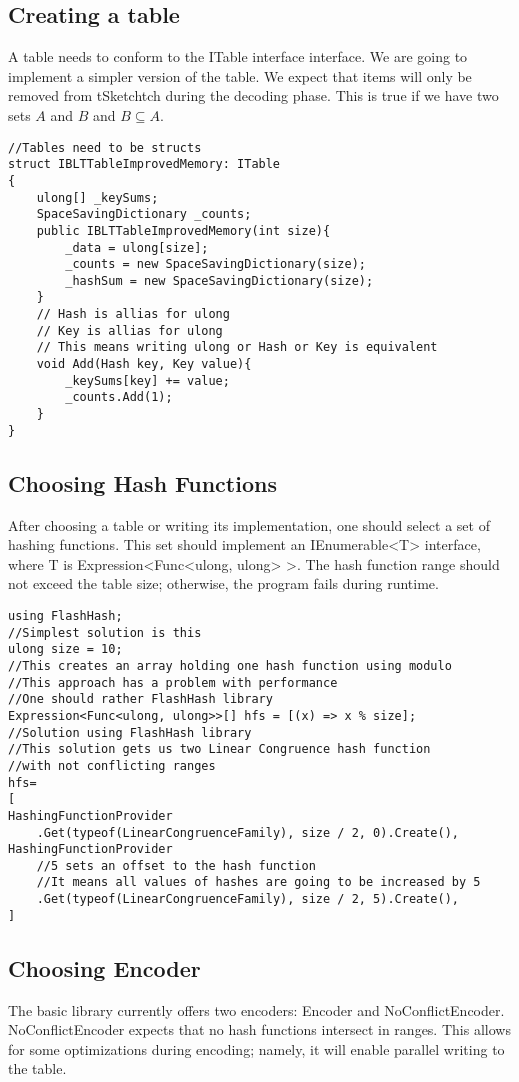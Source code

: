 \subsection{Creating a table}
A table needs to conform to the ITable interface interface. We are going to implement a simpler version of the table. We expect that items will only be removed from tSketchtch during the decoding phase. This is true if we have two sets $A$ and $B$ and $B \subseteq A$.
\begin{lstlisting}
//Tables need to be structs
struct IBLTTableImprovedMemory: ITable
{
    ulong[] _keySums;
    SpaceSavingDictionary _counts;    
    public IBLTTableImprovedMemory(int size){
        _data = ulong[size];
        _counts = new SpaceSavingDictionary(size);
        _hashSum = new SpaceSavingDictionary(size);
    }
    // Hash is allias for ulong
    // Key is allias for ulong
    // This means writing ulong or Hash or Key is equivalent
    void Add(Hash key, Key value){
        _keySums[key] += value;
        _counts.Add(1);
    }
}
\end{lstlisting}

\subsection{Choosing Hash Functions}
After choosing a table or writing its implementation, one should select a set of hashing functions. This set should implement an IEnumerable<T> interface, where T is Expression<Func<ulong, ulong> >. The hash function range should not exceed the table size; otherwise, the program fails during runtime.

\begin{lstlisting}
using FlashHash;
//Simplest solution is this
ulong size = 10;
//This creates an array holding one hash function using modulo
//This approach has a problem with performance
//One should rather FlashHash library
Expression<Func<ulong, ulong>>[] hfs = [(x) => x % size];
//Solution using FlashHash library
//This solution gets us two Linear Congruence hash function
//with not conflicting ranges
hfs= 
[ 
HashingFunctionProvider
    .Get(typeof(LinearCongruenceFamily), size / 2, 0).Create(),
HashingFunctionProvider
    //5 sets an offset to the hash function
    //It means all values of hashes are going to be increased by 5
    .Get(typeof(LinearCongruenceFamily), size / 2, 5).Create(),
]
\end{lstlisting}
\subsection{Choosing Encoder}
The basic library currently offers two encoders: Encoder and NoConflictEncoder. NoConflictEncoder expects that no hash functions intersect in ranges. This allows for some optimizations during encoding; namely, it will enable parallel writing to the table. 

